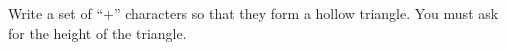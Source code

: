 \question[0]  Write a set of ``+'' characters so that they form a hollow triangle. You must ask for the height of the triangle.
